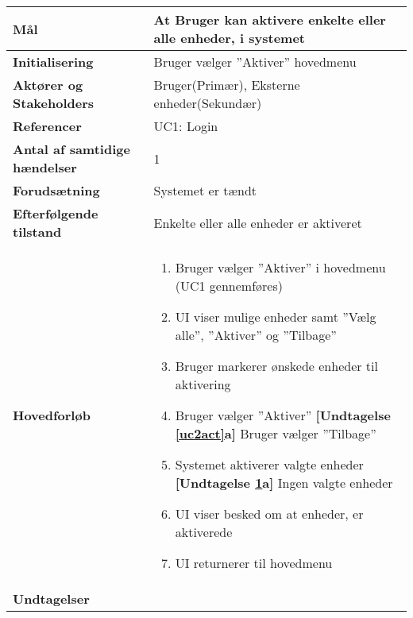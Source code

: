 \begin{table}[H] \centering
	\begin{tabular} {|p{6cm}|p{8cm}|}
	\hline		
		\textbf{Mål}							&At Bruger kan aktivere enkelte eller alle enheder, i systemet\\\hline
		\textbf{Initialisering}				&Bruger vælger ''Aktiver'' hovedmenu  	\\\hline
		\textbf{Aktører og Stakeholders}		&Bruger(Primær), Eksterne enheder(Sekundær) 		\\\hline
		\textbf{Referencer}					&UC1: Login					\\\hline
		\textbf{Antal af samtidige hændelser}&1 							\\\hline
		\textbf{Forudsætning}				&Systemet er tændt\\\hline
		\textbf{Efterfølgende tilstand}		&Enkelte eller alle enheder er aktiveret  \\\hline
		\textbf{Hovedforløb}					
			&\begin{enumerate}				
					
				\item Bruger vælger ''Aktiver'' i hovedmenu (UC1 gennemføres)
										
				\item \label{uc2menu}UI viser mulige enheder samt ''Vælg alle'', ''Aktiver'' og ''Tilbage''
												
				\item Bruger markerer ønskede enheder til aktivering
												
				\item \label{uc2act} Bruger vælger ''Aktiver''\newline
					\textbf{[Undtagelse \ref{uc2act}a]} Bruger vælger ''Tilbage''
												
				\item \label{uc2sysact} Systemet aktiverer valgte enheder \newline
					\textbf{[Undtagelse \ref{uc2sysact}a]} Ingen valgte enheder
				
				\item UI viser besked om at enheder, er aktiverede
																	
				\item UI returnerer til hovedmenu
												
			\end{enumerate}\\ \hline
		
		\textbf{Undtagelser}	
		

\end{tabular}
\end{table}
